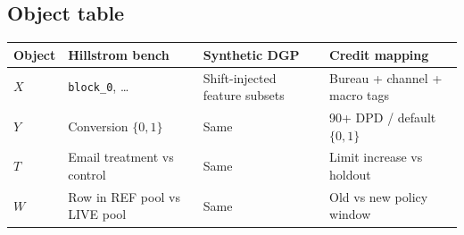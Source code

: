 \documentclass[11pt]{article}
\begin{document}
\subsection{Object table}
\begin{center}
\small
\begin{tabular}{@{}llll@{}}
\toprule
Object & Hillstrom bench & Synthetic DGP & Credit mapping \\
\midrule
$X$ & \texttt{block\_0}, \ldots & Shift-injected feature subsets & Bureau + channel + macro tags \\
$Y$ & Conversion $\{0,1\}$ & Same & 90+ DPD / default $\{0,1\}$ \\
$T$ & Email treatment vs control & Same & Limit increase vs holdout \\
$W$ & Row in REF pool vs LIVE pool & Same & Old vs new policy window \\
\bottomrule
\end{tabular}
\end{center}
\end{document}
